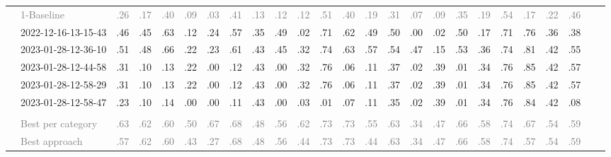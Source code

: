 \begin{table*}
\begin{tabular}{@{}ll@{\hspace{10pt}}c@{\hspace{5pt}}cccccccccccccccccccccc@{}}
& \textcolor{gray}{1-Baseline} & \textcolor{gray}{.26} & \textcolor{gray}{.17} & \textcolor{gray}{.40} & \textcolor{gray}{.09} & \textcolor{gray}{.03} & \textcolor{gray}{.41} & \textcolor{gray}{.13} & \textcolor{gray}{.12} & \textcolor{gray}{.12} & \textcolor{gray}{.51} & \textcolor{gray}{.40} & \textcolor{gray}{.19} & \textcolor{gray}{.31} & \textcolor{gray}{.07} & \textcolor{gray}{.09} & \textcolor{gray}{.35} & \textcolor{gray}{.19} & \textcolor{gray}{.54} & \textcolor{gray}{.17} & \textcolor{gray}{.22} & \textcolor{gray}{.46} \\
& 2022-12-16-13-15-43 & .46 & .45 & .63 & .12 & .24 & .57 & .35 & .49 & .02 & .71 & .62 & .49 & .50 & .00 & .02 & .50 & .17 & .71 & .76 & .36 & .38 \\
& 2023-01-28-12-36-10 & .51 & .48 & .66 & .22 & .23 & .61 & .43 & .45 & .32 & .74 & .63 & .57 & .54 & .47 & .15 & .53 & .36 & .74 & .81 & .42 & .55 \\
& 2023-01-28-12-44-58 & .31 & .10 & .13 & .22 & .00 & .12 & .43 & .00 & .32 & .76 & .06 & .11 & .37 & .02 & .39 & .01 & .34 & .76 & .85 & .42 & .57 \\
& 2023-01-28-12-58-29 & .31 & .10 & .13 & .22 & .00 & .12 & .43 & .00 & .32 & .76 & .06 & .11 & .37 & .02 & .39 & .01 & .34 & .76 & .85 & .42 & .57 \\
& 2023-01-28-12-58-47 & .23 & .10 & .14 & .00 & .00 & .11 & .43 & .00 & .03 & .01 & .07 & .11 & .35 & .02 & .39 & .01 & .34 & .76 & .84 & .42 & .08 \\
\addlinespace
\multicolumn{2}{@{}l}{\emph{Nahj al-Balagha}} \\
& \textcolor{gray}{Best per category} & \textcolor{gray}{.63} & \textcolor{gray}{.62} & \textcolor{gray}{.60} & \textcolor{gray}{.50} & \textcolor{gray}{.67} & \textcolor{gray}{.68} & \textcolor{gray}{.48} & \textcolor{gray}{.56} & \textcolor{gray}{.62} & \textcolor{gray}{.73} & \textcolor{gray}{.73} & \textcolor{gray}{.55} & \textcolor{gray}{.63} & \textcolor{gray}{.34} & \textcolor{gray}{.47} & \textcolor{gray}{.66} & \textcolor{gray}{.58} & \textcolor{gray}{.74} & \textcolor{gray}{.67} & \textcolor{gray}{.54} & \textcolor{gray}{.59} \\
& \textcolor{gray}{Best approach} & \textcolor{gray}{.57} & \textcolor{gray}{.62} & \textcolor{gray}{.60} & \textcolor{gray}{.43} & \textcolor{gray}{.27} & \textcolor{gray}{.68} & \textcolor{gray}{.48} & \textcolor{gray}{.56} & \textcolor{gray}{.44} & \textcolor{gray}{.73} & \textcolor{gray}{.73} & \textcolor{gray}{.44} & \textcolor{gray}{.63} & \textcolor{gray}{.34} & \textcolor{gray}{.47} & \textcolor{gray}{.66} & \textcolor{gray}{.58} & \textcolor{gray}{.74} & \textcolor{gray}{.57} & \textcolor{gray}{.54} & \textcolor{gray}{.59} \\

\end{tabular}
\end{table*}
